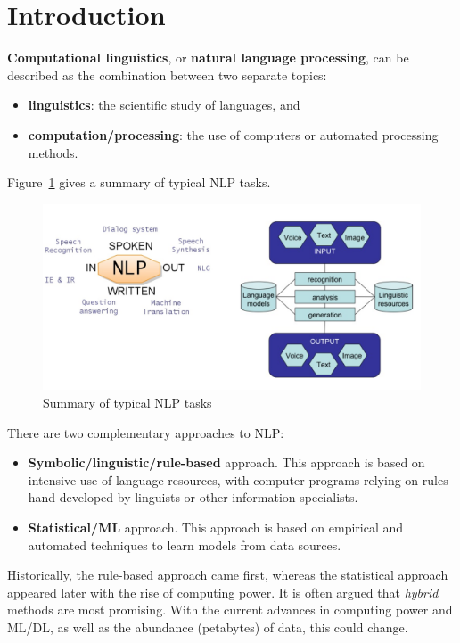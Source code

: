 \section{Introduction}
\begin{mydef}
	\textbf{Computational linguistics}, or \textbf{natural language processing}, can be described as the combination between two separate topics:
	\begin{itemize}
		\item \textbf{linguistics}: the scientific study of languages, and
		\item \textbf{computation/processing}: the use of computers or automated processing methods.
	\end{itemize}
\end{mydef}
Figure~\ref{fig:typical_tasks} gives a summary of typical NLP tasks.
\begin{figure}[!hbtp]
	\centering
	\includegraphics[width=\textwidth]{img/typical_tasks}
	\caption{Summary of typical NLP tasks}
	\label{fig:typical_tasks}
\end{figure}

There are two complementary approaches to NLP:
\begin{itemize}
	\item \textbf{Symbolic/linguistic/rule-based} approach.
	This approach is based on intensive use of language resources, with computer programs relying on rules hand-developed by linguists or other information specialists.
	\item \textbf{Statistical/ML} approach.
	This approach is based on empirical and automated techniques to learn models from data sources.
\end{itemize}
Historically, the rule-based approach came first, whereas the statistical approach appeared later with the rise of computing power.
It is often argued that \emph{hybrid} methods are most promising.
With the current advances in computing power and ML/DL, as well as the abundance (petabytes) of data, this could change.